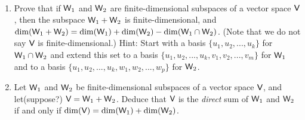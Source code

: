 \begin{exercise} \label{exercise 1.6.29} \ 

\begin{enumerate}
\item Prove that if \(\textsf{W}_1\) and \(\textsf{W}_2\) are finite-dimensional subspaces of a vector space \(\textsf{V}\), then  the subspace \(\textsf{W}_1 + \textsf{W}_2\) is finite-dimensional,  and \(\dim(\textsf{W}_1 + \textsf{W}_2) = \dim(\textsf{W}_1) + \dim(\textsf{W}_2) - \dim(\textsf{W}_1 \cap \textsf{W}_2)\).
(Note that we do not say \(\textsf{V}\) is finite-dimensional.)
Hint: Start with a basis \(\{ u_1, u_2, ..., u_k \}\) for \(\textsf{W}_1 \cap \textsf{W}_2\) and extend this set to a basis \(\{ u_1, u_2, ..., u_k, v_1, v_2, ..., v_m \}\) for \(\textsf{W}_1\) and to a basis \(\{ u_1, u_2, ..., u_k, w_1, w_2, ..., w_p \}\) for \(\textsf{W}_2\).
\item Let \(\textsf{W}_1\) and \(\textsf{W}_2\) be finite-dimensional subspaces of a vector space \(\textsf{V}\), and let(suppose?) \(\textsf{V} = \textsf{W}_1 + \textsf{W}_2\). 
Deduce that \(\textsf{V}\) is the \emph{direct} sum of \(\textsf{W}_1\)
and \(\textsf{W}_2\) if and only if \(\dim(\textsf{V}) = \dim(\textsf{W}_1) + \dim(\textsf{W}_2)\).
\end{enumerate}
\end{exercise}

